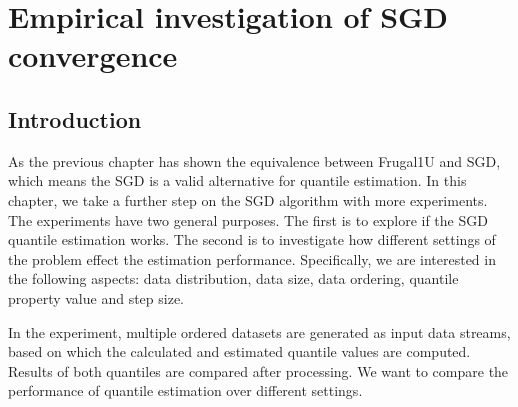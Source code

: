 
% 
\graphicspath{{Figures/Experiment_results/SGD/}{./}} 
\captionsetup[figure]{font=scriptsize,labelfont=bf}


\chapter{Empirical investigation of SGD convergence}
\label{ch: sgd_exp}

\section{Introduction}
\label{sec: exp_intro}
As the previous chapter has shown the equivalence between Frugal1U and SGD, which means the SGD is a valid alternative for quantile estimation.
In this chapter, we take a further step on the SGD algorithm with more experiments.
The experiments have two general purposes. The first is to explore if the SGD quantile estimation works.
The second is to investigate how different settings of the problem effect the estimation performance. Specifically, we are interested in the following aspects: data distribution, data size, data ordering, quantile property value and step size.

In the experiment, multiple ordered datasets are generated as input data streams, based on which the calculated and estimated quantile values are computed. Results of both quantiles are compared after processing. We want to compare the performance of quantile estimation over different settings.



